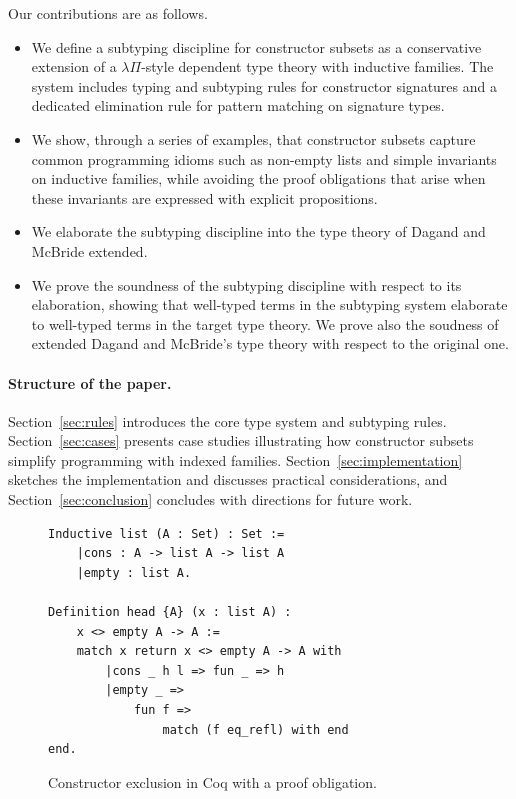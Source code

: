 \documentclass[a4paper, anonymous, UKenglish,cleveref, autoref, thm-restate]{lipics-v2021}
\begin{document}
Our contributions are as follows.
\begin{itemize}
\item We define a subtyping discipline for constructor subsets as a conservative extension of a $\lambda\Pi$-style dependent type theory with inductive families. The system includes typing and subtyping rules for constructor signatures and a dedicated elimination rule for pattern matching on signature types.
\item We show, through a series of examples, that constructor subsets capture common programming idioms such as non-empty lists and simple invariants on inductive families, while avoiding the proof obligations that arise when these invariants are expressed with explicit propositions.
\item We elaborate the subtyping discipline into the type theory of Dagand and McBride extended.
\item We prove the soundness of the subtyping discipline with respect to its elaboration, showing that well-typed terms in the subtyping system elaborate to well-typed terms in the target type theory. We prove also the soudness of extended Dagand and McBride's type theory with respect to the original one.
\end{itemize}

\paragraph*{Structure of the paper.}
Section~\ref{sec:rules} introduces the core type system and subtyping rules.
Section~\ref{sec:cases} presents case studies illustrating how constructor subsets simplify programming with indexed families.
Section~\ref{sec:implementation} sketches the implementation and discusses practical considerations, and Section~\ref{sec:conclusion} concludes with directions for future work.

\begin{figure}
\begin{lstlisting}[language=Coq]
Inductive list (A : Set) : Set :=
    |cons : A -> list A -> list A
    |empty : list A.

Definition head {A} (x : list A) : 
    x <> empty A -> A := 
    match x return x <> empty A -> A with
        |cons _ h l => fun _ => h
        |empty _ => 
            fun f => 
                match (f eq_refl) with end
end.
\end{lstlisting}
\caption{Constructor exclusion in Coq with a proof obligation.}
\label{fig:coq-obligation}
\end{figure}
\end{document}
